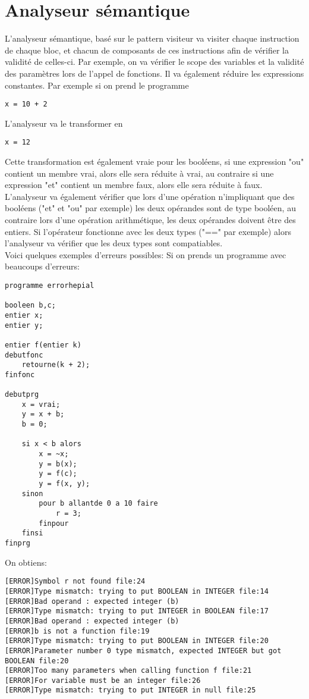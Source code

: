 \documentclass{article}
\begin{document}
\section{Analyseur sémantique}
L'analyseur sémantique, basé sur le pattern visiteur va visiter chaque instruction de chaque bloc, et chacun de composants de ces instructions afin de vérifier la validité de celles-ci. Par exemple, on va vérifier le scope des variables et la validité des paramètres lors de l'appel de fonctions. Il va également réduire les expressions constantes. Par exemple si on prend le programme
\begin{verbatim}
x = 10 + 2    
\end{verbatim}
L'analyseur va le transformer en
\begin{verbatim}
x = 12
\end{verbatim}
Cette transformation est également vraie pour les booléens, si une expression "ou" contient un membre vrai, alors elle sera réduite à vrai, au contraire si une expression "et" contient un membre faux, alors elle sera réduite à faux. \\
L'analyseur va également vérifier que lors d'une opération n'impliquant que des booléens ("et" et "ou" par exemple) les deux opérandes sont de type booléen, au contraire lors d'une opération arithmétique, les deux opérandes doivent être des entiers. Si l'opérateur fonctionne avec les deux types ("==" par exemple) alors l'analyseur va vérifier que les deux types sont compatiables.\\
Voici quelques exemples d'erreurs possibles:
Si on prends un programme avec beaucoups d'erreurs:
\begin{lstlisting}
programme errorhepial

booleen b,c;
entier x;
entier y;

entier f(entier k)
debutfonc
	retourne(k + 2);
finfonc

debutprg
	x = vrai;
	y = x + b;
	b = 0;
	
	si x < b alors
		x = ~x;
		y = b(x);	
		y = f(c);
		y = f(x, y);
	sinon
		pour b allantde 0 a 10 faire
			r = 3;
		finpour
	finsi
finprg
\end{lstlisting}
On obtiens:
\begin{verbatim}
[ERROR]Symbol r not found file:24
[ERROR]Type mismatch: trying to put BOOLEAN in INTEGER file:14
[ERROR]Bad operand : expected integer (b)
[ERROR]Type mismatch: trying to put INTEGER in BOOLEAN file:17
[ERROR]Bad operand : expected integer (b)
[ERROR]b is not a function file:19
[ERROR]Type mismatch: trying to put BOOLEAN in INTEGER file:20
[ERROR]Parameter number 0 type mismatch, expected INTEGER but got BOOLEAN file:20
[ERROR]Too many parameters when calling function f file:21
[ERROR]For variable must be an integer file:26
[ERROR]Type mismatch: trying to put INTEGER in null file:25
\end{verbatim}
\end{document}
